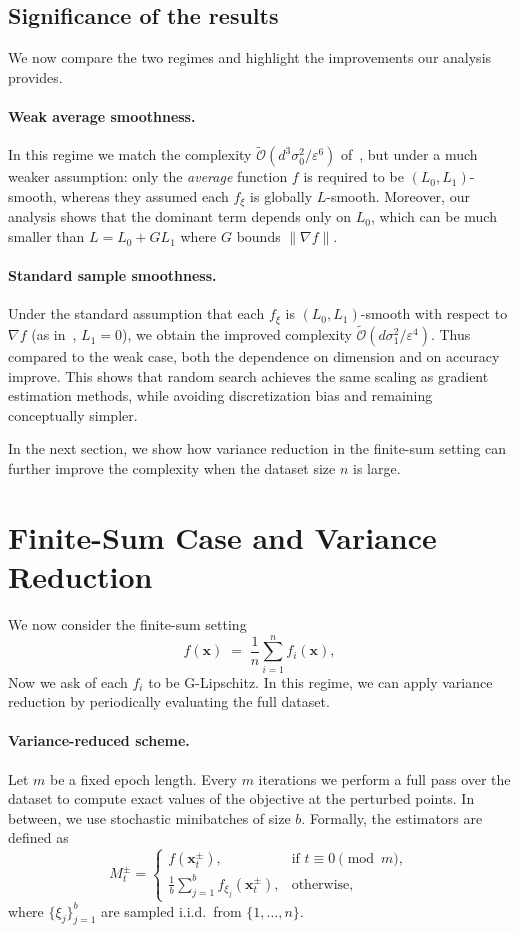 \documentclass[twoside]{article}
\theoremstyle{plain}
\theoremstyle{definition}
\theoremstyle{remark}
\def\cO{{\mathcal{O}}}
\def\vx{{\bm{x}}}
\begin{document}
\subsection{Significance of the results}

We now compare the two regimes and highlight the improvements our analysis provides.

\paragraph{Weak average smoothness.}
In this regime we match the complexity
$\tilde{\cO}(d^3\sigma_0^2/\varepsilon^6)$ of~\cite{boucherouite2024mistp}, but
under a much weaker assumption: only the \emph{average} function $f$ is required
to be $(L_0,L_1)$-smooth, whereas they assumed each $f_\xi$ is globally
$L$-smooth. Moreover, our analysis shows that the dominant term depends only on
$L_0$, which can be much smaller than $L=L_0+GL_1$ where $G$ bounds
$\|\nabla f\|$.

\paragraph{Standard sample smoothness.}
Under the standard assumption that each $f_\xi$ is $(L_0,L_1)$-smooth with
respect to $\nabla f$ (as in~\cite{ghadimi2013stochastic}, $L_1=0$), we obtain
the improved complexity $\tilde{\cO}(d\sigma_1^2/\varepsilon^4)$. Thus compared
to the weak case, both the dependence on dimension and on accuracy improve. This
shows that random search achieves the same scaling as gradient estimation
methods, while avoiding discretization bias and remaining conceptually simpler.

\medskip
In the next section, we show how variance reduction in the finite-sum setting
can further improve the complexity when the dataset size $n$ is large.

\section{Finite-Sum Case and Variance Reduction}\label{sec:finite-sum}

We now consider the finite-sum setting
\[
    f(\vx) \;=\; \frac{1}{n}\sum_{i=1}^n f_i(\vx),
\]
Now we ask of each $f_i$ to be G-Lipschitz. In this regime, we can apply variance
reduction by periodically evaluating the full dataset.

\paragraph{Variance-reduced scheme.}
Let $m$ be a fixed epoch length. Every $m$ iterations we perform a full pass
over the dataset to compute exact values of the objective at the perturbed
points. In between, we use stochastic minibatches of size $b$.  
Formally, the estimators are defined as
\[
   M_t^\pm =
   \begin{cases}
      f(\vx_t^\pm), & \text{if } t \equiv 0 \pmod{m}, \\[6pt]
      \tfrac{1}{b}\sum_{j=1}^b f_{\xi_j}(\vx_t^\pm),
      & \text{otherwise},
   \end{cases}
\]
where $\{\xi_j\}_{j=1}^b$ are sampled i.i.d.\ from $\{1,\dots,n\}$.
\end{document}
